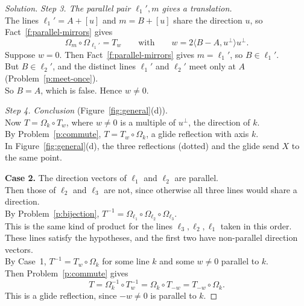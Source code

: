 \documentclass[11pt,a4paper]{article}
\theoremstyle{boxed}
\theoremstyle{definition}
\newenvironment{solution}{\begin{proof}[Solution]}{\end{proof}}
\newcommand{\ip}[2]{\langle #1, #2 \rangle}
\begin{document}
\begin{solution}
\newpage\noindent
\textit{Step 3. The parallel pair $\ell_1',m$ gives a translation.}\\
The lines $\ell_1'=A+[u]$ and $m=B+[u]$ share the direction $u$, so Fact~\ref{f:parallel-mirrors} gives
\[
\Omega_m\circ\Omega_{\ell_1'}=T_w \qquad\text{with}\qquad w=2\ip{B-A}{u^\perp}u^\perp.
\]
Suppose $w=0$. Then Fact~\ref{f:parallel-mirrors} gives $m=\ell_1'$, so $B\in\ell_1'$.\\
But $B\in\ell_2'$, and the distinct lines $\ell_1'$ and $\ell_2'$ meet only at $A$ (Problem~\ref{p:meet-once}).\\
So $B=A$, which is false. Hence $w\neq0$.

\smallskip\noindent
\textit{Step 4. Conclusion} (Figure~\ref{fig:general}(d)).\\
Now $T=\Omega_k\circ T_w$, where $w\neq0$ is a multiple of $u^\perp$, the direction of $k$.\\
By Problem~\ref{p:commute}, $T=T_w\circ\Omega_k$, a glide reflection with axis $k$.\\
In Figure~\ref{fig:general}(d), the three reflections (dotted) and the glide send $X$ to the same point.

\medskip\noindent
\textbf{Case 2.} The direction vectors of $\ell_1$ and $\ell_2$ are parallel.\\
Then those of $\ell_2$ and $\ell_3$ are not, since otherwise all three lines would share a direction.\\
By Problem~\ref{p:bijection}, $T^{-1}=\Omega_{\ell_1}\circ\Omega_{\ell_2}\circ\Omega_{\ell_3}$.\\
This is the same kind of product for the lines $\ell_3,\ell_2,\ell_1$ taken in this order.\\
These lines satisfy the hypotheses, and the first two have non-parallel direction vectors.\\
By Case~1, $T^{-1}=T_w\circ\Omega_k$ for some line $k$ and some $w\neq0$ parallel to $k$.\\
Then Problem~\ref{p:commute} gives
\[
T=\Omega_k^{-1}\circ T_w^{-1}=\Omega_k\circ T_{-w}=T_{-w}\circ\Omega_k.
\]
This is a glide reflection, since $-w\neq0$ is parallel to $k$.
\end{solution}
\end{document}
